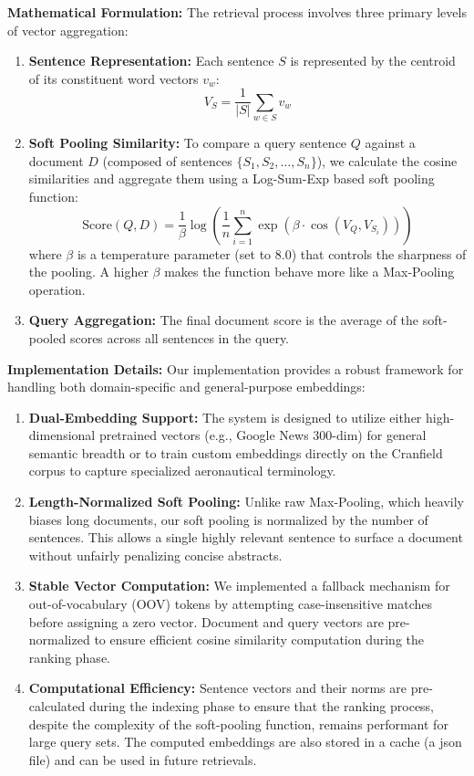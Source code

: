 \documentclass{article}
\begin{document}
\textbf{Mathematical Formulation:}
The retrieval process involves three primary levels of vector aggregation:
\begin{enumerate}
    \item \textbf{Sentence Representation:} Each sentence $S$ is represented by the centroid of its constituent word vectors $v_w$:
    \[ V_S = \frac{1}{|S|} \sum_{w \in S} v_w \]
    \item \textbf{Soft Pooling Similarity:} To compare a query sentence $Q$ against a document $D$ (composed of sentences $\{S_1, S_2, \dots, S_n\}$), we calculate the cosine similarities and aggregate them using a Log-Sum-Exp based soft pooling function:
    \[ \text{Score}(Q, D) = \frac{1}{\beta} \log \left( \frac{1}{n} \sum_{i=1}^{n} \exp(\beta \cdot \cos(V_Q, V_{S_i})) \right) \]
    where $\beta$ is a temperature parameter (set to $8.0$) that controls the sharpness of the pooling. A higher $\beta$ makes the function behave more like a Max-Pooling operation.
    \item \textbf{Query Aggregation:} The final document score is the average of the soft-pooled scores across all sentences in the query.
\end{enumerate}

\textbf{Implementation Details:}
Our implementation provides a robust framework for handling both domain-specific and general-purpose embeddings:
\begin{enumerate}
    \item \textbf{Dual-Embedding Support:} The system is designed to utilize either high-dimensional pretrained vectors (e.g., Google News 300-dim) for general semantic breadth or to train custom embeddings directly on the Cranfield corpus to capture specialized aeronautical terminology.
    \item \textbf{Length-Normalized Soft Pooling:} Unlike raw Max-Pooling, which heavily biases long documents, our soft pooling is normalized by the number of sentences. This allows a single highly relevant sentence to surface a document without unfairly penalizing concise abstracts.
    \item \textbf{Stable Vector Computation:} We implemented a fallback mechanism for out-of-vocabulary (OOV) tokens by attempting case-insensitive matches before assigning a zero vector. Document and query vectors are pre-normalized to ensure efficient cosine similarity computation during the ranking phase.
    \item \textbf{Computational Efficiency:} Sentence vectors and their norms are pre-calculated during the indexing phase to ensure that the ranking process, despite the complexity of the soft-pooling function, remains performant for large query sets. The computed embeddings are also stored in a cache (a json file) and can be used in future retrievals.
\end{enumerate}
\end{document}

